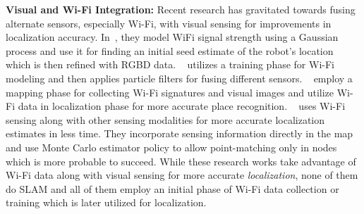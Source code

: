 \textbf{Visual and Wi-Fi Integration:} Recent research has gravitated towards fusing alternate sensors, especially Wi-Fi, with visual sensing for improvements in localization accuracy.
In~\cite{loc-unc-5}, they model WiFi signal strength using a Gaussian process and use it for finding an initial seed estimate of the robot's location which is then refined with RGBD data.
~\cite{thrun:cam-wifi} utilizes a training phase for Wi-Fi modeling and then applies particle filters for fusing different sensors. %
~\cite{visual_wifi_1,dong_sensys15} employ a mapping phase for collecting Wi-Fi signatures and visual images and utilize Wi-Fi data in localization phase for more accurate place recognition. 
~\cite{humanoid_wifi} uses Wi-Fi sensing along with other sensing modalities for more accurate localization estimates in less time. They incorporate sensing information directly in the map and use Monte Carlo estimator policy to allow point-matching only in nodes which is more probable to succeed.
While these research works take advantage of Wi-Fi data along with visual sensing for more accurate {\em localization}, none of them do SLAM and all of them employ an initial phase of Wi-Fi data collection or training which is later utilized for localization. 

